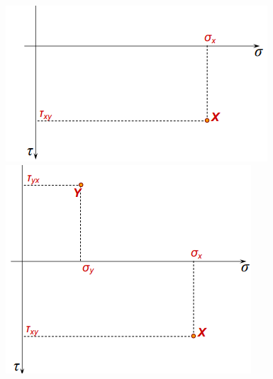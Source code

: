 \documentclass[class=report, crop=false, 12pt,a4paper]{standalone}
\begin{document}
\begin{figure}[H]
    \begin{minipage}{0.25\textwidth}
        \centering
        \includegraphics[width=\textwidth]{../img/diagram49.png}   
    \end{minipage}
    \begin{minipage}{0.25\textwidth}
        \centering
        \includegraphics[width=\textwidth]{../img/diagram52.png}   
    \end{minipage}
    \begin{minipage}{0.25\textwidth}
        \centering

\end{minipage}
\end{figure}
\end{document}
